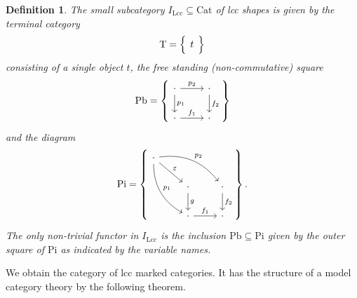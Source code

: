 \documentclass{article}
\newtheorem{definition}{Definition}
\begin{document}
\begin{definition}
  The small subcategory $I_\mathrm{Lcc} \subseteq \mathrm{Cat}$ of \emph{lcc shapes} is given by the terminal category 
  \begin{equation}
    \mathrm{T} =
    \left\{
      \begin{tikzcd}
        t
      \end{tikzcd}
    \right\}
  \end{equation}
  consisting of a single object $t$, the free standing (non-commutative) square
  \begin{equation}
    \mathrm{Pb} =
    \left\{
      \begin{tikzcd}
        \cdot \arrow[d, "p_1"] \arrow[r, "p_2"] & \cdot \arrow[d, "f_2"] \\
        \cdot \arrow[r, "f_1"] & \cdot
      \end{tikzcd}
    \right\}
  \end{equation}
  and the diagram
  \begin{equation}
    \mathrm{Pi} =
    \left\{
      \begin{tikzcd}
        \cdot \arrow[ddr, bend right, "p_1"] \arrow[drr, bend left, "p_2"] \arrow[dr, "\varepsilon"] \\
        & \cdot \arrow[d, "g"] & \cdot \arrow[d, "f_2"] \\
        & \cdot \arrow[r, "f_1"] & \cdot
      \end{tikzcd}
    \right\}.
  \end{equation}
  The only non-trivial functor in $I_\mathrm{Lcc}$ is the inclusion $\mathrm{Pb} \subseteq \mathrm{Pi}$ given by the outer square of $\mathrm{Pi}$ as indicated by the variable names.
\end{definition}

We obtain the category of lcc marked categories.
It has the structure of a model category theory by the following theorem.
\end{document}

